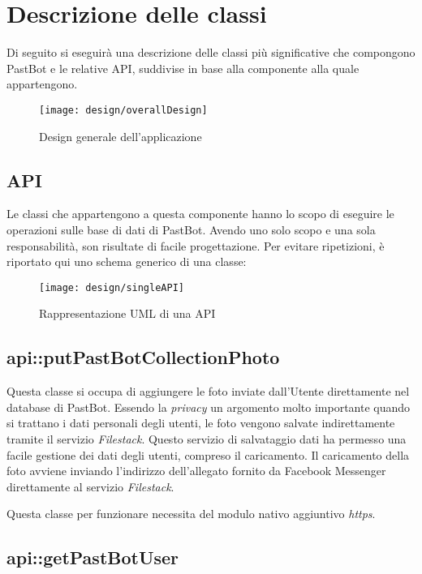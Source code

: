\section{Descrizione delle classi}
Di seguito si eseguirà una descrizione delle classi più significative che
compongono PastBot e le relative API, suddivise in base alla componente alla
quale appartengono.

\begin{figure}[H]
  \centering
  \texttt{[image: design/overallDesign]}
  \caption{Design generale dell'applicazione}
\end{figure}

\subsection{API}

Le classi che appartengono a questa componente hanno lo scopo di eseguire le
operazioni sulle base di dati di PastBot. Avendo uno solo scopo e una sola
responsabilità, son risultate di facile progettazione.
Per evitare ripetizioni, è riportato qui uno schema generico di una classe:

\begin{figure}[H]
  \centering
  \texttt{[image: design/singleAPI]}
  \caption{Rappresentazione UML di una API}
\end{figure}


\subsection{api::putPastBotCollectionPhoto}

Questa classe si occupa di aggiungere le foto inviate dall'Utente direttamente
nel database di PastBot. Essendo la \textit{privacy} un argomento molto
importante quando si trattano i dati personali degli utenti, le foto vengono
salvate indirettamente tramite il servizio \textit{Filestack}. Questo
servizio di salvataggio dati ha permesso una facile gestione dei dati degli
utenti, compreso il caricamento. Il caricamento della foto avviene inviando
l'indirizzo dell'allegato fornito da Facebook Messenger direttamente al
servizio \textit{Filestack}.


Questa classe per funzionare necessita del modulo nativo aggiuntivo
\textit{https}.

\subsection{api::getPastBotUser}


